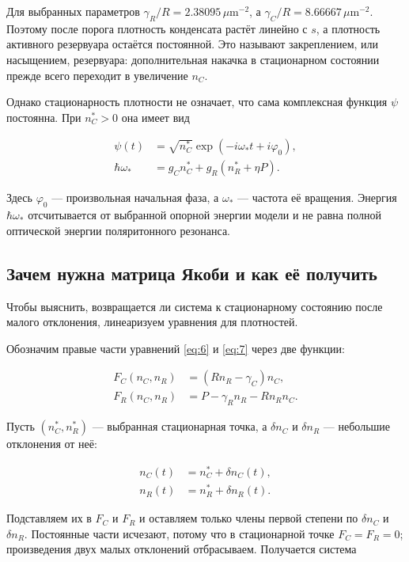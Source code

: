 \documentclass[12pt,a4paper]{article}
\begin{document}
Для выбранных параметров $\gamma_{R}/R=2.38095\,\mu\mathrm m^{-2}$, а $\gamma_{C}/R=8.66667\,\mu\mathrm m^{-2}$. Поэтому после порога плотность конденсата растёт линейно с $s$, а плотность активного резервуара остаётся постоянной. Это называют закреплением, или насыщением, резервуара: дополнительная накачка в стационарном состоянии прежде всего переходит в увеличение $n_{C}$.

Однако стационарность плотности не означает, что сама комплексная функция $\psi$ постоянна. При $n_{C}^{*}>0$ она имеет вид

\begin{equation}\label{eq:11}
\begin{aligned}
\psi(t)&=\sqrt{n_C^*}\exp(-i\omega_*t+i\varphi_0),\\
\hbar\omega_*&=g_Cn_C^*+g_R(n_R^*+\eta P).
\end{aligned}\end{equation}

Здесь $\varphi_{0}$ --- произвольная начальная фаза, а $\omega_{*}$ --- частота её вращения. Энергия $\hbar \omega_{*}$ отсчитывается от выбранной опорной энергии модели и не равна полной оптической энергии поляритонного резонанса.

\subsection{Зачем нужна матрица Якоби и как её получить}\label{sec:3.3}

Чтобы выяснить, возвращается ли система к стационарному состоянию после малого отклонения, линеаризуем уравнения для плотностей.

Обозначим правые части уравнений \eqref{eq:6} и \eqref{eq:7} через две функции:

\[
\begin{aligned}F_C(n_C,n_R)&=(Rn_R-\gamma_C)n_C,\\F_R(n_C,n_R)&=P-\gamma_R n_R-Rn_Rn_C.\end{aligned}
\]

Пусть $(n_{C}^{*},n_{R}^{*})$ --- выбранная стационарная точка, а $\delta n_{C}$ и $\delta n_{R}$ --- небольшие отклонения от неё:

\[
\begin{aligned}n_C(t)&=n_C^*+\delta n_C(t),\\n_R(t)&=n_R^*+\delta n_R(t).\end{aligned}
\]

Подставляем их в $F_{C}$ и $F_{R}$ и оставляем только члены первой степени по $\delta n_{C}$ и $\delta n_{R}$. Постоянные части исчезают, потому что в стационарной точке $F_{C}=F_{R}=0$; произведения двух малых отклонений отбрасываем. Получается система
\end{document}
